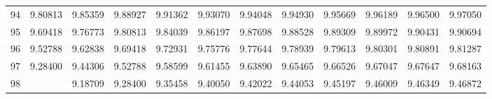 \begin{center}
\begin{tabular}{|r|rrrrrrrrrrr|}
94&9.80813&9.85359&9.88927&9.91362&9.93070&9.94048&9.94930&9.95669&9.96189&9.96500&9.97050\\[5pt]
95&9.69418&9.76773&9.80813&9.84039&9.86197&9.87698&9.88528&9.89309&9.89972&9.90431&9.90694\\
96&9.52788&9.62838&9.69418&9.72931&9.75776&9.77644&9.78939&9.79613&9.80301&9.80891&9.81287\\
97&9.28400&9.44306&9.52788&9.58599&9.61455&9.63890&9.65465&9.66526&9.67047&9.67647&9.68163\\
98&&9.18709&9.28400&9.35458&9.40050&9.42022&9.44053&9.45197&9.46009&9.46349&9.46872\\
\hline\end{tabular}
\end{center}
